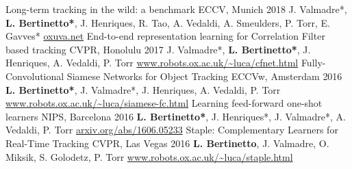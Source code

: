 \begin{cvpapers}
  \cvpapertitle
    {Long-term tracking in the wild: a benchmark} %
    {ECCV, Munich} %
    {2018} %
  \cvpaperauthors
    {J. Valmadre*, \textbf{L. Bertinetto*}, J. Henriques, R. Tao, A. Vedaldi, A. Smeulders, P. Torr, E. Gavves*}
    {} %
    {} %
  \cvpaperurl
    {\href{http://oxuva.net}{oxuva.net}}
    {} %
    {} %
  \cvpapertitle
    {End-to-end representation learning for Correlation Filter based tracking} %
    {CVPR, Honolulu} %
    {2017} %
  \cvpaperauthors
    {J. Valmadre*, \textbf{L. Bertinetto*}, J. Henriques, A. Vedaldi, P. Torr}
    {} %
    {} %
  \cvpaperurl
    {\href{http://www.robots.ox.ac.uk/~luca/cfnet.html}{www.robots.ox.ac.uk/\textasciitilde luca/cfnet.html}}
    {} %
    {} %
  \cvpapertitle
    {Fully-Convolutional Siamese Networks for Object Tracking} %
    {ECCVw, Amsterdam} %
    {2016} %
  \cvpaperauthors
    {\textbf{L. Bertinetto*}, J. Valmadre*, J. Henriques, A. Vedaldi, P. Torr}
    {} %
    {} %
  \cvpaperurl
    {\href{http://www.robots.ox.ac.uk/~luca/siamese-fc.html}{www.robots.ox.ac.uk/\textasciitilde luca/siamese-fc.html}}
    {} %
    {} %
  \cvpapertitle
    {Learning feed-forward one-shot learners} %
    {NIPS, Barcelona} %
    {2016} %
  \cvpaperauthors
    {\textbf{L. Bertinetto*}, J. Henriques*, J. Valmadre*, A. Vedaldi, P. Torr}
    {} %
    {} %
  \cvpaperurl
    {\href{http://arxiv.org/abs/1606.05233}{arxiv.org/abs/1606.05233}}
    {} %
    {} %
  \cvpapertitle
    {Staple: Complementary Learners for Real-Time Tracking} %
    {CVPR, Las Vegas} %
    {2016} %
  \cvpaperauthors
    {\textbf{L. Bertinetto}, J. Valmadre, O. Miksik, S. Golodetz, P. Torr}
    {} %
    {} %
  \cvpaperurl
    {\href{http://www.robots.ox.ac.uk/~luca/staple.html}{www.robots.ox.ac.uk/\textasciitilde luca/staple.html}}
    {} %
    {} %


\end{cvpapers}

